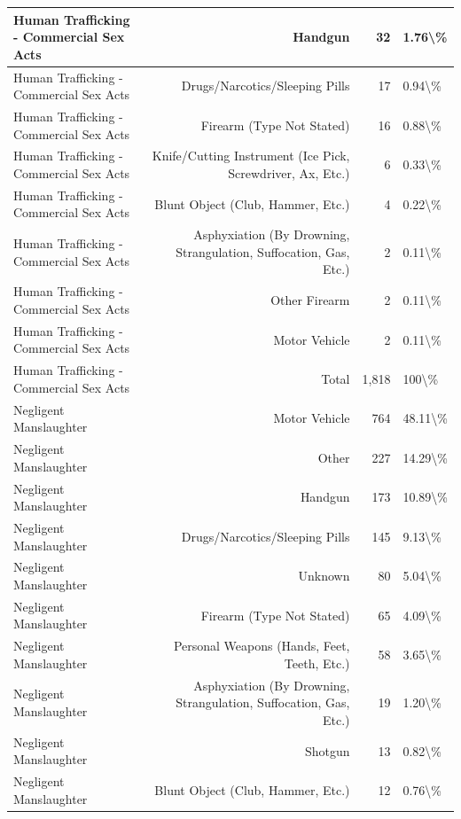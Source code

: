 \documentclass[
]{krantz}
\begin{document}
\begin{longtable}[t]{l|r|r|l}
\hline
Human Trafficking - Commercial Sex Acts & Handgun & 32 & 1.76\textbackslash{}\%\\
\hline
Human Trafficking - Commercial Sex Acts & Drugs/Narcotics/Sleeping Pills & 17 & 0.94\textbackslash{}\%\\
\hline
Human Trafficking - Commercial Sex Acts & Firearm (Type Not Stated) & 16 & 0.88\textbackslash{}\%\\
\hline
Human Trafficking - Commercial Sex Acts & Knife/Cutting Instrument (Ice Pick, Screwdriver, Ax, Etc.) & 6 & 0.33\textbackslash{}\%\\
\hline
Human Trafficking - Commercial Sex Acts & Blunt Object (Club, Hammer, Etc.) & 4 & 0.22\textbackslash{}\%\\
\hline
Human Trafficking - Commercial Sex Acts & Asphyxiation (By Drowning, Strangulation, Suffocation, Gas, Etc.) & 2 & 0.11\textbackslash{}\%\\
\hline
Human Trafficking - Commercial Sex Acts & Other Firearm & 2 & 0.11\textbackslash{}\%\\
\hline
Human Trafficking - Commercial Sex Acts & Motor Vehicle & 2 & 0.11\textbackslash{}\%\\
\hline
Human Trafficking - Commercial Sex Acts & Total & 1,818 & 100\textbackslash{}\%\\
\hline
Negligent Manslaughter & Motor Vehicle & 764 & 48.11\textbackslash{}\%\\
\hline
Negligent Manslaughter & Other & 227 & 14.29\textbackslash{}\%\\
\hline
Negligent Manslaughter & Handgun & 173 & 10.89\textbackslash{}\%\\
\hline
Negligent Manslaughter & Drugs/Narcotics/Sleeping Pills & 145 & 9.13\textbackslash{}\%\\
\hline
Negligent Manslaughter & Unknown & 80 & 5.04\textbackslash{}\%\\
\hline
Negligent Manslaughter & Firearm (Type Not Stated) & 65 & 4.09\textbackslash{}\%\\
\hline
Negligent Manslaughter & Personal Weapons (Hands, Feet, Teeth, Etc.) & 58 & 3.65\textbackslash{}\%\\
\hline
Negligent Manslaughter & Asphyxiation (By Drowning, Strangulation, Suffocation, Gas, Etc.) & 19 & 1.20\textbackslash{}\%\\
\hline
Negligent Manslaughter & Shotgun & 13 & 0.82\textbackslash{}\%\\
\hline
Negligent Manslaughter & Blunt Object (Club, Hammer, Etc.) & 12 & 0.76\textbackslash{}\%\\

\end{longtable}
\end{document}
